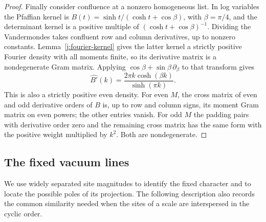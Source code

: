 \begin{proof}
Finally consider confluence at a nonzero homogeneous list. In log
variables the Pfaffian kernel is
$B(t)=\sinh t/(\cosh t+\cos\beta)$, with $\beta=\pi/4$, and the
determinant kernel is a positive multiple of
$(\cosh t+\cos\beta)^{-1}$. Dividing the Vandermondes takes confluent
row and column derivatives, up to nonzero constants.
Lemma~\ref{j:fourier-kernel} gives the latter kernel a strictly
positive Fourier density with all moments finite, so its derivative
matrix is a nondegenerate Gram matrix. Applying
$\cos\beta+\sin\beta\,\partial_\beta$ to that transform gives
\[
\widehat{B'}(k)=\frac{2\pi k\cosh(\beta k)}{\sinh(\pi k)}.
\]
This is also a strictly positive even density. For even $M$, the
cross matrix of even and odd derivative orders of $B$ is, up to
row and column signs, its moment Gram matrix on even powers; the
other entries vanish. For odd $M$ the padding pairs with derivative
order zero and the remaining cross matrix has the same form with the
positive weight multiplied by $k^2$. Both are nondegenerate.
\end{proof}

\subsection{The fixed vacuum lines}

We use widely separated site magnitudes to identify the fixed character
and to locate the possible poles of its projection. The following
description also records the common similarity needed when the sites of
a scale are interspersed in the cyclic order.

